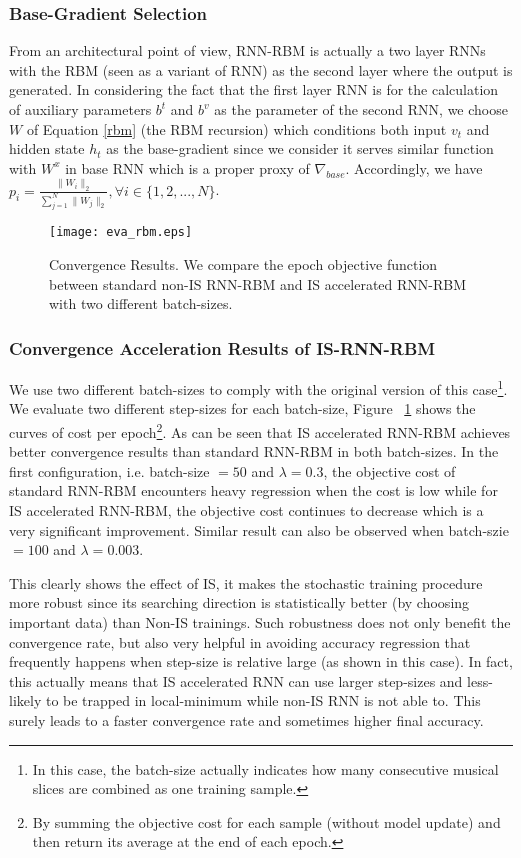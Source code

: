 \documentclass[twoside,leqno,twocolumn]{article}
\begin{document}
\subsubsection{Base-Gradient Selection}
From an architectural point of view, RNN-RBM is actually a two layer RNNs with the RBM (seen as a variant of RNN) as the second layer where the output is generated. In considering the fact that the first layer RNN is for the calculation of auxiliary parameters $b^t$ and $b^v$ as the parameter of the second RNN, we choose $W$ of Equation \ref{rbm} (the RBM recursion) which conditions both input $v_t$ and hidden state $h_t$ as the base-gradient since we consider it serves similar function with $W^x$ in base RNN which is a proper proxy of $\nabla_{base}$. Accordingly, we have $p_i=\frac{\|W_i\|_2}{\sum_{j=1}^{N}\|W_j\|_2}, \forall i \in \{1,2,...,N\}$.
\begin{figure}[t]
	\centering
	\texttt{[image: eva\_rbm.eps]}
	\caption{Convergence Results. We compare the epoch objective function between standard non-IS RNN-RBM and IS accelerated RNN-RBM with two different batch-sizes.}
	\label{rbm_eval}
\end{figure}
\subsubsection{Convergence Acceleration Results of IS-RNN-RBM}
We use two different batch-sizes to comply with the original version of this case\footnote{In this case, the batch-size actually indicates how many consecutive musical slices are combined as one training sample.}. We evaluate two different step-sizes for each batch-size, Figure ~\ref{rbm_eval} shows the curves of cost per epoch\footnote{By summing the objective cost for each sample (without model update) and then return its average at the end of each epoch.}. As can be seen that IS accelerated RNN-RBM achieves better convergence results than standard RNN-RBM in both batch-sizes. In the first configuration, i.e. batch-size $=50$ and $\lambda=0.3$, the objective cost of standard RNN-RBM encounters heavy regression when the cost is low while for IS accelerated RNN-RBM, the objective cost continues to decrease which is a very significant improvement. Similar result can also be observed when batch-szie $=100$ and $\lambda=0.003$. 

This clearly shows the effect of IS, it makes the stochastic training procedure more robust since its searching direction is statistically better (by choosing important data) than Non-IS trainings. Such robustness does not only benefit the convergence rate, but also very helpful in avoiding accuracy regression that frequently happens when step-size is relative large (as shown in this case). In fact, this actually means that IS accelerated RNN can use larger step-sizes and less-likely to be trapped in local-minimum while non-IS RNN is not able to. This surely leads to a faster convergence rate and sometimes higher final accuracy.
\end{document}
